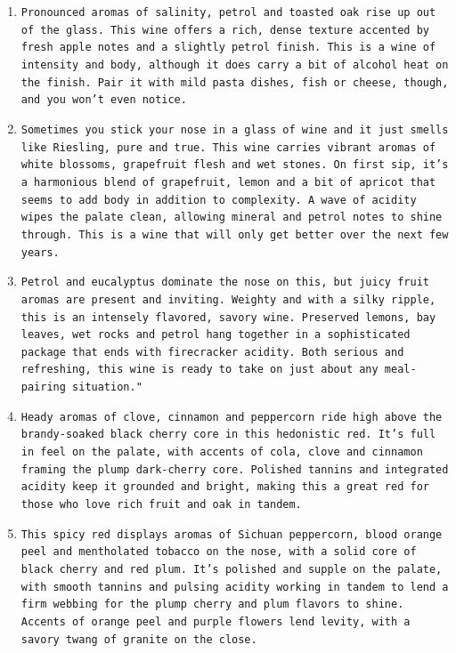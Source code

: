 \documentclass[
	a4paper,
	fontsize=10pt, %
	twoside=false, %
	secnumdepth=2, %
]{kaohandt}
\begin{document}
\begin{enumerate}
	\item \small\texttt{Pronounced aromas of salinity, petrol and toasted oak rise up out of the glass. This wine offers a rich, dense texture accented by fresh apple notes and a slightly petrol finish. This is a wine of intensity and body, although it does carry a bit of alcohol heat on the finish. Pair it with mild pasta dishes, fish or cheese, though, and you won't even notice.}
	\item \small\texttt{Sometimes you stick your nose in a glass of wine and it just smells like Riesling, pure and true. This wine carries vibrant aromas of white blossoms, grapefruit flesh and wet stones. On first sip, it's a harmonious blend of grapefruit, lemon and a bit of apricot that seems to add body in addition to complexity. A wave of acidity wipes the palate clean, allowing mineral and petrol notes to shine through. This is a wine that will only get better over the next few years.}
	\item \small\texttt{Petrol and eucalyptus dominate the nose on this, but juicy fruit aromas are present and inviting. Weighty and with a silky ripple, this is an intensely flavored, savory wine. Preserved lemons, bay leaves, wet rocks and petrol hang together in a sophisticated package that ends with firecracker acidity. Both serious and refreshing, this wine is ready to take on just about any meal-pairing situation."}
	\item \small\texttt{Heady aromas of clove, cinnamon and peppercorn ride high above the brandy-soaked black cherry core in this hedonistic red. It's full in feel on the palate, with accents of cola, clove and cinnamon framing the plump dark-cherry core. Polished tannins and integrated acidity keep it grounded and bright, making this a great red for those who love rich fruit and oak in tandem.}
	\item \small\texttt{This spicy red displays aromas of Sichuan peppercorn, blood orange peel and mentholated tobacco on the nose, with a solid core of black cherry and red plum. It's polished and supple on the palate, with smooth tannins and pulsing acidity working in tandem to lend a firm webbing for the plump cherry and plum flavors to shine. Accents of orange peel and purple flowers lend levity, with a savory twang of granite on the close.}
\end{enumerate}
\end{document}
